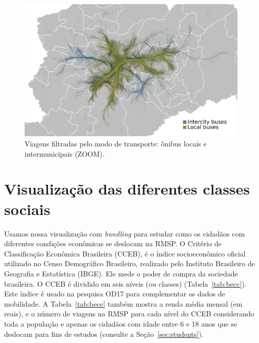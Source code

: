 \begin{figure}[!htb]
  \centering
  \captionsetup{justification=centering}
  \includegraphics[width=0.98\textwidth]{../figuras/local-intercity-buses}
  \caption{Viagens filtradas pelo modo de transporte: ônibus locais e intermunicipais (ZOOM). \label{fig:bus-integration-zoom}}
\end{figure}

\section{Visualização das diferentes classes sociais}
\label{sec:strata}

Usamos nossa visualização com \emph{bundling} para estudar como os cidadãos com diferentes
condições econômicas se deslocam na RMSP. O Critério de Classificação Econômica
Brasileira (CCEB), \citet{cceb2008} é o índice socioeconômico oficial utilizado no Censo
Demográfico Brasileiro, realizado pelo Instituto Brasileiro de Geografia e
Estatística (IBGE). Ele mede o poder de compra da sociedade brasileira. O CCEB é
dividido em seis níveis (ou classes) (Tabela~\ref{tab:becc}). Este índice é usado na pesquisa
OD17 para complementar os dados de mobilidade. A Tabela~\ref{tab:becc} também mostra a renda
média mensal (em reais), e o número de viagens na RMSP para cada nível do CCEB considerando toda a população e apenas
os cidadãos com idade entre 6 e 18 anos que se deslocam para fins de estudos (consulte a
Seção~\ref{sec:students}).

